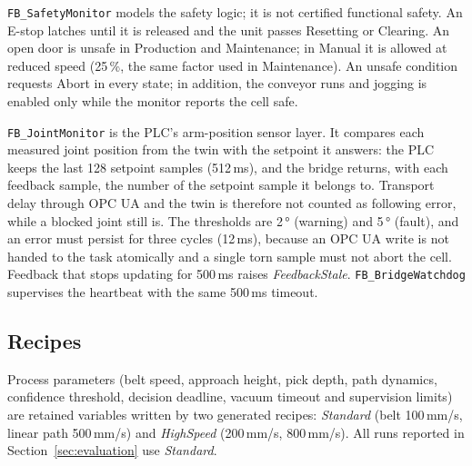 \texttt{FB\_SafetyMonitor} models the safety logic; it is not certified functional safety. An
E-stop latches until it is released and the unit passes Resetting or Clearing. An open door is
unsafe in Production and Maintenance; in Manual it is allowed at reduced speed (25\,\%, the same
factor used in Maintenance). An unsafe condition requests Abort in every state; in addition,
the conveyor runs and jogging is enabled only while the monitor reports the cell safe.

\texttt{FB\_JointMonitor} is the PLC's arm-position sensor layer. It compares each measured
joint position from the twin with the setpoint it answers: the PLC keeps the last 128 setpoint
samples (512\,ms), and the bridge returns, with each feedback sample, the number of the setpoint
sample it belongs to. Transport delay through OPC UA and the twin is therefore not counted as
following error, while a blocked joint still is. The thresholds are 2\,° (warning) and 5\,°
(fault), and an error must persist for three cycles (12\,ms), because an OPC UA write is not
handed to the task atomically and a single torn sample must not abort the cell. Feedback that
stops updating for 500\,ms raises \emph{FeedbackStale}. \texttt{FB\_BridgeWatchdog} supervises
the heartbeat with the same 500\,ms timeout.

\subsection{Recipes}

Process parameters (belt speed, approach height, pick depth, path dynamics, confidence
threshold, decision deadline, vacuum timeout and supervision limits) are retained variables
written by two generated recipes: \emph{Standard} (belt 100\,mm/s, linear path 500\,mm/s) and
\emph{HighSpeed} (200\,mm/s, 800\,mm/s). All runs reported in Section~\ref{sec:evaluation} use
\emph{Standard}.
